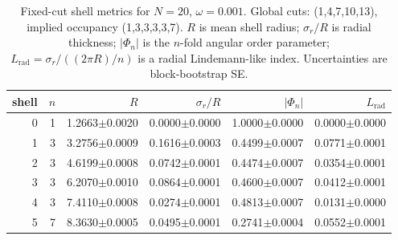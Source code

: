 \begin{table}[t]
\centering
\small
\setlength{\tabcolsep}{4pt}
\renewcommand{\arraystretch}{1.15}
\begin{tabular}{rrrrrr}
\toprule
shell & $n$ & $R$ & $\sigma_r/R$ & $|\Phi_n|$ & $L_{\mathrm{rad}}$ \\
\midrule
0 & 1 & 1.2663$\pm$0.0020 & 0.0000$\pm$0.0000 & 1.0000$\pm$0.0000 & 0.0000$\pm$0.0000 \\
1 & 3 & 3.2756$\pm$0.0009 & 0.1616$\pm$0.0003 & 0.4499$\pm$0.0007 & 0.0771$\pm$0.0001 \\
2 & 3 & 4.6199$\pm$0.0008 & 0.0742$\pm$0.0001 & 0.4474$\pm$0.0007 & 0.0354$\pm$0.0001 \\
3 & 3 & 6.2070$\pm$0.0010 & 0.0864$\pm$0.0001 & 0.4600$\pm$0.0007 & 0.0412$\pm$0.0001 \\
4 & 3 & 7.4110$\pm$0.0008 & 0.0274$\pm$0.0001 & 0.4813$\pm$0.0007 & 0.0131$\pm$0.0000 \\
5 & 7 & 8.3630$\pm$0.0005 & 0.0495$\pm$0.0001 & 0.2741$\pm$0.0004 & 0.0552$\pm$0.0001 \\
\bottomrule
\end{tabular}
\caption{Fixed-cut shell metrics for $N=20$, $\omega=0.001$. Global cuts: (1,4,7,10,13), implied occupancy (1,3,3,3,3,7). $R$ is mean shell radius; $\sigma_r/R$ is radial thickness; $|\Phi_n|$ is the $n$-fold angular order parameter; $L_{\mathrm{rad}}=\sigma_r / ((2\pi R)/n)$ is a radial Lindemann-like index. Uncertainties are block-bootstrap SE.}
\label{tab:shells_N20_omega0p001}
\end{table}